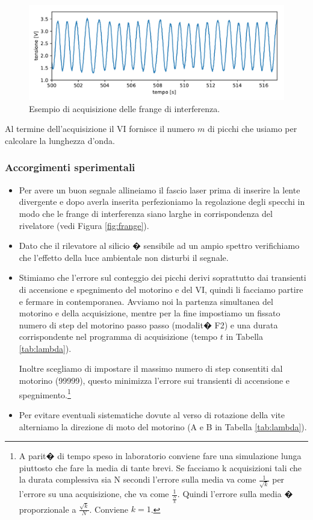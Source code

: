 \documentclass[a4paper]{article}
\begin{document}
\begin{figure}[H]
	\includegraphics[width=1\textwidth]{esempio_acquisizione_frange.pdf}
	\caption{Esempio di acquisizione delle frange di interferenza.}
	\label{fig:esempio_acquisizione_frange}
\end{figure}

\begin{multicols}{2}

Al termine dell'acquisizione il VI fornisce il numero $m$ di picchi che usiamo per calcolare la lunghezza d'onda.

\subsubsection{Accorgimenti sperimentali}
\begin{itemize}
	\item Per avere un buon segnale allineiamo il fascio laser prima di inserire la lente divergente e dopo averla inserita perfezioniamo la regolazione degli specchi in modo che le frange di interferenza siano larghe in corrispondenza del rivelatore (vedi Figura \ref{fig:frange}).
	\item Dato che il rilevatore al silicio � sensibile ad un ampio spettro verifichiamo che l'effetto della luce ambientale non disturbi il segnale.
	\item Stimiamo che l'errore sul conteggio dei picchi derivi soprattutto dai transienti di accensione e spegnimento del motorino e del VI, quindi li facciamo partire e fermare in contemporanea. Avviamo noi la partenza simultanea del motorino e della acquisizione, mentre per la fine impostiamo un fissato numero di step del motorino passo passo (modalit� F2) e una durata corrispondente nel programma di acquisizione (tempo $t$ in Tabella \ref{tab:lambda}).
	
	Inoltre scegliamo di impostare il massimo numero di step consentiti dal motorino (99999), questo minimizza l'errore sui transienti di accensione e spegnimento.\footnote{A parit� di tempo speso in laboratorio conviene fare una simulazione lunga piuttosto che fare la media di tante brevi. Se facciamo k acquisizioni tali che la durata complessiva sia N secondi l'errore sulla media va come $\frac{1}{\sqrt{k}}$ per l'errore su una acquisizione, che va come $\frac{1}{\frac{N}{k}}$. Quindi l'errore sulla media � proporzionale a $\frac{\sqrt{k}}{N}$. Conviene $k=1$.}
	\item Per evitare eventuali sistematiche dovute al verso di rotazione della vite alterniamo la direzione di moto del motorino (A e B in Tabella \ref{tab:lambda}).
\end{itemize}


\end{multicols}
\end{document}
